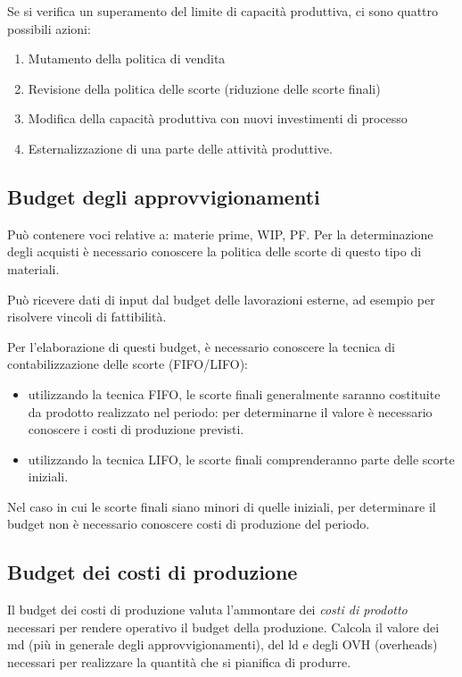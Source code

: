 Se si verifica un superamento del limite di capacità produttiva, ci sono
quattro possibili azioni:
\begin{enumerate}
	\item Mutamento della politica di vendita
	\item Revisione della politica delle scorte (riduzione delle scorte
	finali)
	\item Modifica della capacità produttiva con nuovi investimenti di
	processo
	\item Esternalizzazione di una parte delle attività produttive.
\end{enumerate}

\subsection{Budget degli approvvigionamenti}
Può contenere voci relative a: materie prime, WIP, PF.
Per la determinazione degli acquisti è necessario conoscere
la politica delle scorte di questo tipo di materiali.

Può ricevere dati di input dal budget delle lavorazioni
esterne, ad esempio per risolvere vincoli di fattibilità.

Per l’elaborazione di questi budget, è necessario conoscere la
tecnica di contabilizzazione delle scorte (FIFO/LIFO):
\begin{itemize}
	\item utilizzando la tecnica FIFO, le scorte finali
	generalmente saranno costituite da prodotto realizzato nel periodo:
	per determinarne il valore è necessario conoscere i costi di
	produzione previsti.
	\item utilizzando la tecnica LIFO, le scorte finali comprenderanno parte
	delle scorte iniziali.
\end{itemize}


Nel caso in cui le scorte finali siano minori di quelle iniziali, per determinare
il budget non è necessario conoscere costi di produzione del
periodo.

\subsection{Budget dei costi di produzione}
Il budget dei costi di produzione valuta l’ammontare dei \emph{costi di prodotto}
necessari per rendere operativo il budget della produzione.
Calcola il valore dei \gls{md} (più in generale degli approvvigionamenti), del
{ld} e degli OVH (overheads) necessari per realizzare la quantità che si pianifica di
produrre.

